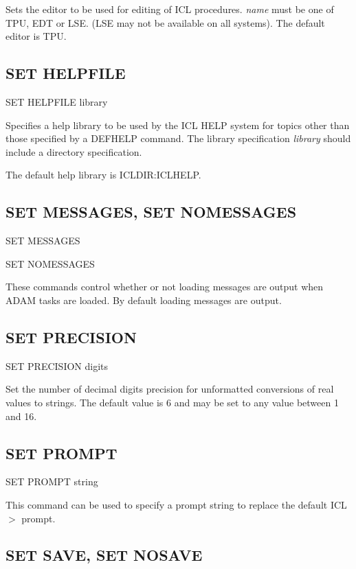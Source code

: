 \documentclass[twoside,11pt]{report}
\newcommand{\xlabel}[1]{}
\begin{document}
Sets the editor to be used for editing of ICL procedures. {\em name}
must be one of TPU, EDT or LSE. (LSE may not be available on all systems).
The default editor is TPU.

\subsection{\xlabel{SET_HELPFILE}SET HELPFILE\label{SET_HELPFILE}}

   SET HELPFILE library

Specifies a help library to be used by the ICL HELP system for topics other
than those specified by a DEFHELP command. The library specification
{\em library} should include a directory specification.

The default help library is ICLDIR:ICLHELP.


\subsection{\xlabel{SET_MESSAGES}SET MESSAGES, SET NOMESSAGES\label{SET_MESSAGES}}

   SET MESSAGES

   SET NOMESSAGES

These commands control whether or not loading messages are output when
ADAM tasks are loaded. By default loading messages are output.

\subsection{\xlabel{SET_PRECISION}SET PRECISION\label{SET_PRECISION}}

   SET PRECISION \hspace{.5cm} digits

Set the number of decimal digits precision for unformatted conversions
of real values to strings. The default value is 6 and may be set to any
value between 1 and 16.

\subsection{\xlabel{SET_PROMPT}SET PROMPT\label{SET_PROMPT}}

   SET PROMPT \hspace{.5cm} string

This command can be used to specify a prompt string to replace the
default ICL$>$ prompt.

\subsection{\xlabel{SET_SAVE}SET SAVE, SET NOSAVE\label{SET_SAVE}}
\end{document}
